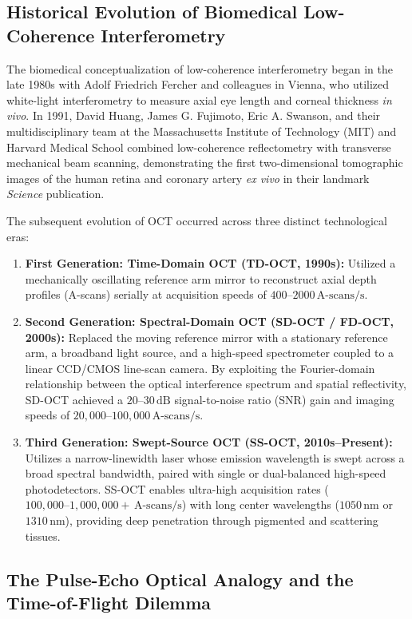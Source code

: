 \documentclass[11pt,a4paper]{article}
\begin{document}
\subsection{Historical Evolution of Biomedical Low-Coherence Interferometry}

The biomedical conceptualization of low-coherence interferometry began in the late 1980s with Adolf Friedrich Fercher and colleagues in Vienna, who utilized white-light interferometry to measure axial eye length and corneal thickness \textit{in vivo}. In 1991, David Huang, James G. Fujimoto, Eric A. Swanson, and their multidisciplinary team at the Massachusetts Institute of Technology (MIT) and Harvard Medical School combined low-coherence reflectometry with transverse mechanical beam scanning, demonstrating the first two-dimensional tomographic images of the human retina and coronary artery \textit{ex vivo} in their landmark \textit{Science} publication.

The subsequent evolution of OCT occurred across three distinct technological eras:
\begin{enumerate}[leftmargin=*]
    \item \textbf{First Generation: Time-Domain OCT (TD-OCT, 1990s):} Utilized a mechanically oscillating reference arm mirror to reconstruct axial depth profiles (A-scans) serially at acquisition speeds of $400\text{--}2000\,\text{A-scans/s}$.
    \item \textbf{Second Generation: Spectral-Domain OCT (SD-OCT / FD-OCT, 2000s):} Replaced the moving reference mirror with a stationary reference arm, a broadband light source, and a high-speed spectrometer coupled to a linear CCD/CMOS line-scan camera. By exploiting the Fourier-domain relationship between the optical interference spectrum and spatial reflectivity, SD-OCT achieved a $20\text{--}30\,\text{dB}$ signal-to-noise ratio (SNR) gain and imaging speeds of $20,000\text{--}100,000\,\text{A-scans/s}$.
    \item \textbf{Third Generation: Swept-Source OCT (SS-OCT, 2010s--Present):} Utilizes a narrow-linewidth laser whose emission wavelength is swept across a broad spectral bandwidth, paired with single or dual-balanced high-speed photodetectors. SS-OCT enables ultra-high acquisition rates ($100,000\text{--}1,000,000+\,\text{A-scans/s}$) with long center wavelengths ($1050\,\text{nm}$ or $1310\,\text{nm}$), providing deep penetration through pigmented and scattering tissues.
\end{enumerate}

\subsection{The Pulse-Echo Optical Analogy and the Time-of-Flight Dilemma}
\end{document}
